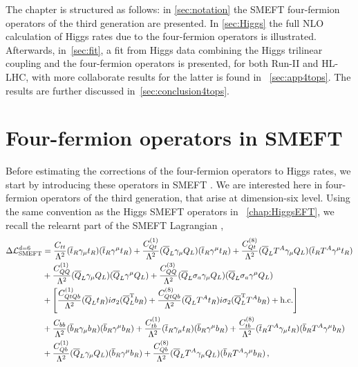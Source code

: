 \par 
The chapter is structured as follows: in \autoref{sec:notation} the SMEFT four-fermion operators of the third generation are presented. In \autoref{sec:Higgs} the full NLO calculation of Higgs rates due to the four-fermion operators is illustrated. Afterwards, in~\autoref{sec:fit}, a fit from Higgs data combining the Higgs trilinear coupling and the four-fermion operators is presented, for both Run-II and HL-LHC, with more collaborate results for the latter is found in ~\autoref{sec:app4tops}. The results are further discussed in~\autoref{sec:conclusion4tops}.
\section{Four-fermion operators in SMEFT \label{sec:notation}}
Before estimating the corrections of the four-fermion operators to Higgs rates, we start by introducing these operators in SMEFT .
We are interested here in  four-fermion operators of the third generation, that arise at dimension-six level. 
Using the same convention as the Higgs SMEFT operators in ~\autoref{chap:HiggsEFT}, we recall the relearnt part of the SMEFT Lagrangian \cite{Grzadkowski:2010es}, 
%
\begin{align}
	\Delta \mathcal{L}_{\mathrm{SMEFT}}^{d=6}&=\frac{C_{tt}}{\Lambda^2}(\overline{t}_R \gamma_{\mu} t_R)(\overline{t}_R \gamma^{\mu} t_R)+\frac{C_{Qt}^{(1)}}{\Lambda^2}(\overline{Q}_L \gamma_{\mu} Q_L)(\overline{t}_R \gamma^{\mu} t_R)+\frac{C_{Qt}^{(8)}}{\Lambda^2}(\overline{Q}_L T^A\gamma_{\mu} Q_L)(\overline{t}_R T^A\gamma^{\mu} t_R) \nonumber\\ \label{eq:Lag}
	&+\frac{C_{QQ}^{(1)}}{\Lambda^2}(\overline{Q}_L \gamma_{\mu} Q_L)(\overline{Q}_L \gamma^{\mu} Q_L)+\frac{C_{QQ}^{(3)}}{\Lambda^2}(\overline{Q}_L \sigma_a \gamma_{\mu} Q_L)(\overline{Q}_L  \sigma_a \gamma^{\mu} Q_L)\\ &+\left[\frac{C^{(1)}_{QtQb}}{\Lambda^2} (\overline{Q}_L t_R )i\sigma_2(\overline{Q}_L^\mathrm{ T} b_R) +\frac{C^{(8)}_{QtQb}}{\Lambda^2} (\overline{Q}_L T^A t_R) i\sigma_2 (\overline{Q}_L^{\mathrm {T}} T^A b_R) + \mathrm{h.c.} \right]\,\nonumber
	\\
	&+ \frac{C_{bb}}{\Lambda^2}(\overline{b}_R \gamma_{\mu} b_R)(\overline{b}_R \gamma^{\mu} b_R) +\frac{C_{tb}^{(1)}}{\Lambda^2}(\overline{t}_R \gamma_{\mu} t_R)(\overline{b}_R \gamma^{\mu} b_R)+\frac{C_{tb}^{(8)}}{\Lambda^2}(\overline{t}_R T^A\gamma_{\mu} t_R)(\overline{b}_R T^A\gamma^{\mu} b_R) \nonumber \\
	& +\frac{C_{Qb}^{(1)}}{\Lambda^2}(\overline{Q}_L \gamma_{\mu} Q_L)(\overline{b}_R \gamma^{\mu} b_R)+\frac{C_{Qb}^{(8)}}{\Lambda^2}(\overline{Q}_L T^A\gamma_{\mu} Q_L)(\overline{b}_R T^A\gamma^{\mu} b_R) \,,\nonumber
\end{align}
